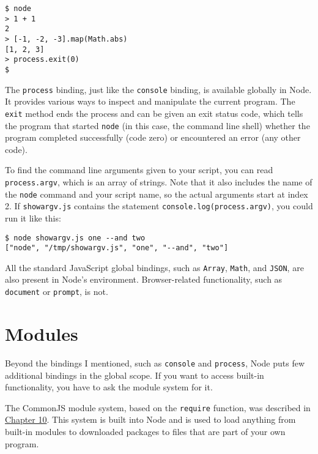 \begin{lstlisting}
$ node
> 1 + 1
2
> [-1, -2, -3].map(Math.abs)
[1, 2, 3]
> process.exit(0)
$
\end{lstlisting}
\noindent{}

The \lstinline`process` binding, just like the \lstinline`console` binding, is available globally in Node. It provides various ways to inspect and manipulate the current program. The \lstinline`exit` method ends the process and can be given an exit status code, which tells the program that started \lstinline`node` (in this case, the command line shell) whether the program completed successfully (code zero) or encountered an error (any other code).

To find the command line arguments given to your script, you can read \lstinline`process.argv`, which is an array of strings. Note that it also includes the name of the \lstinline`node` command and your script name, so the actual arguments start at index 2. If \lstinline`showargv.js` contains the statement \lstinline`console.log(process.argv)`, you could run it like this:

\begin{lstlisting}
$ node showargv.js one --and two
["node", "/tmp/showargv.js", "one", "--and", "two"]
\end{lstlisting}
\noindent{}

All the standard JavaScript global bindings, such as \lstinline`Array`, \lstinline`Math`, and \lstinline`JSON`, are also present in Node's environment. Browser-related functionality, such as \lstinline`document` or \lstinline`prompt`, is not.

\section{Modules}

Beyond the bindings I mentioned, such as \lstinline`console` and \lstinline`process`, Node puts few additional bindings in the global scope. If you want to access built-in functionality, you have to ask the module system for it.

The CommonJS module system, based on the \lstinline`require` function, was described in \hyperref[modules.commonjs]{Chapter 10}. This system is built into Node and is used to load anything from built-in modules to downloaded packages to files that are part of your own program.


